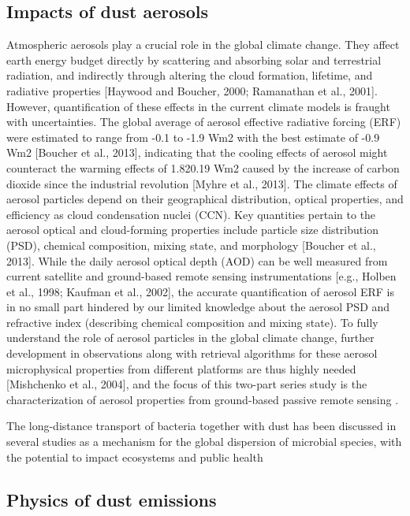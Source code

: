 \subsection{Impacts of dust aerosols}

Atmospheric aerosols play a crucial role in the global 
climate change. They affect earth energy budget directly 
by scattering and absorbing solar and terrestrial radiation, 
and indirectly through altering the cloud formation, 
lifetime, and radiative properties [Haywood and Boucher, 
2000; Ramanathan et al., 2001]. However, quantification of 
these effects in the current climate models is fraught with 
uncertainties. The global average of aerosol effective 
radiative forcing (ERF) were estimated to range from -0.1 
to -1.9 Wm2 with the best estimate of -0.9 Wm2 [Boucher et 
al., 2013], indicating that the cooling effects of aerosol 
might counteract the warming effects of 1.820.19 Wm2 caused
by the increase of carbon dioxide since the industrial 
revolution [Myhre et al., 2013]. The climate effects of 
aerosol particles depend on their geographical distribution, 
optical properties, and efficiency as cloud condensation 
nuclei (CCN). Key quantities pertain to the aerosol optical 
and cloud-forming properties include particle size 
distribution (PSD), chemical composition, mixing state, and 
morphology [Boucher et al., 2013]. While the daily aerosol 
optical depth (AOD) can be well measured from current 
satellite and ground-based remote sensing instrumentations 
[e.g., Holben et al., 1998; Kaufman et al., 2002], the 
accurate quantification of aerosol ERF is in no small part 
hindered by our limited knowledge about the aerosol PSD and 
refractive index (describing chemical composition and 
mixing state). To fully understand the role of aerosol 
particles in the global climate change, further development 
in observations along with retrieval algorithms for these 
aerosol microphysical properties from different platforms 
are thus highly needed [Mishchenko et al., 2004], and 
the focus of this two-part series study is the 
characterization of aerosol properties from ground-based 
passive remote sensing \citep{henze07}. 

  The long-distance transport of bacteria together with dust 
  has been discussed in several studies as a mechanism for 
  the global dispersion of microbial species, 
  with the potential to impact ecosystems and public health
  \citep{griffin01,burrows09}

\subsection{Physics of dust emissions}

